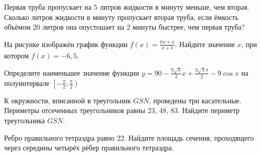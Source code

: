 \begin{taskBN}{9}
Первая труба пропускает на 5 литров жидкости в минуту меньше, чем вторая. Сколько литров жидкости в минуту пропускает вторая труба, если ёмкость объёмом 20 литров она опустошает на 2 минуты быстрее, чем первая труба?

\end{taskBN}

\begin{taskBN}{10}
На рисунке изображён график функции $f(x)=\frac{kx+a}{x+b}$. Найдите значение $x$, при котором $f(x)=-6{,}5$.
\end{taskBN}

\begin{taskBN}{11}
Определите наименьшее значение функции $y =90-\frac{9\sqrt{3}}{2}x+\frac{3\sqrt{3}\pi}{2}-9\cos x$ на полуинтервале $\left[-\frac{\pi}{2};\frac{\pi}{2} \right)$
\end{taskBN}


\cleardoublepage

\def\examvart{Вариант 13.2}

\normalsize



\large

\begin{taskBN}{1}
К окружности, вписанной в треугольник $GSN$, проведены три касательные. Периметры отсеченных треугольников равны 23, 48, 83. Найдите периметр треугольника $GSN$.
\end{taskBN}

\begin{taskBN}{2}
Ребро правильного тетраэдра равно 22. Найдите площадь сечения, проходящего через середины четырёх рёбер правильного тетраэдра.
\end{taskBN}

